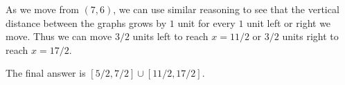 \begin{enumerate}
As we move from $(7,6)$, we can use similar reasoning to see that the vertical distance between the graphs grows by $1$ unit for every $1$ unit left or right we move. Thus we can move $3/2$ units left to reach $x = 11/2$ or $3/2$ units right to reach $x = 17/2$.\par 
The final answer is $\boxed{[5/2,7/2]\cup [11/2,17/2]}$.
\end{enumerate}